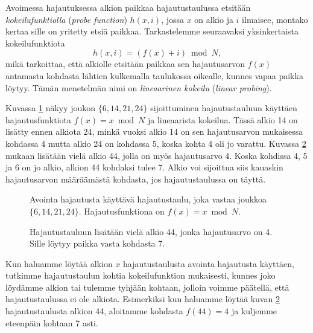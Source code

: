 
Avoimessa hajautuksessa alkion paikkaa hajautustaulussa etsitään
\emph{kokeilufunktiolla} (\emph{probe function})
$h(x,i)$, jossa $x$ on alkio ja $i$ ilmaisee, montako kertaa
sille on yritetty etsiä paikkaa.
Tarkastelemme seuraavaksi yksinkertaista kokeilufunktiota
\[ h(x,i) = (f(x)+i) \bmod N,\]
mikä tarkoittaa, että alkiolle etsitään paikkaa sen
hajautusarvon $f(x)$ antamasta kohdasta lähtien kulkemalla taulukossa oikealle,
kunnes vapaa paikka löytyy.
Tämän menetelmän nimi on \emph{lineaarinen kokeilu}
(\emph{linear probing}).

Kuvassa \ref{fig:hajavo} näkyy joukon $\{6,14,21,24\}$
sijoittuminen hajautustauluun
käyttäen hajautusfunktiota $f(x)=x \bmod N$ ja lineaarista kokeilua.
Tässä alkio 14 on lisätty ennen alkiota 24,
minkä vuoksi alkio 14 on sen hajautusarvon mukaisessa kohdassa 4
mutta alkio 24 on kohdassa 5, koska kohta 4 oli jo varattu.
Kuvassa \ref{fig:hajav2} mukaan lisätään vielä alkio 44,
jolla on myös hajautusarvo 4.
Koska kohdissa 4, 5 ja 6 on jo alkio, alkion 44 kohdaksi tulee 7.
Alkio voi sijoittua siis kauaskin hajautusarvon määräämästä kohdasta,
jos hajautustaulussa on täyttä.

\begin{figure}
\center
{}
\caption{Avointa hajautusta käyttävä hajautustaulu, joka vastaa joukkoa $\{6,14,21,24\}$.
Hajautusfunktiona on $f(x)=x \bmod N$.}
\label{fig:hajavo}
\end{figure}

\begin{figure}
\center
{}
\caption{Hajautustauluun lisätään vielä alkio 44, jonka hajautusarvo on 4.
Sille löytyy paikka vasta kohdasta 7.}
\label{fig:hajav2}
\end{figure}

Kun haluamme löytää alkion $x$ hajautustaulusta avointa hajautusta käyt\-täen,
tutkimme hajautustaulun kohtia kokeilufunktion mukaisesti,
kunnes joko löydämme alkion tai tulemme tyhjään kohtaan, jolloin voimme päätellä,
että hajautustaulussa ei ole alkiota.
Esimerkiksi kun haluamme löytää kuvan \ref{fig:hajav2} hajautustaulusta
alkion 44, aloitamme kohdasta $f(44)=4$ ja kuljemme eteenpäin kohtaan 7 asti.

